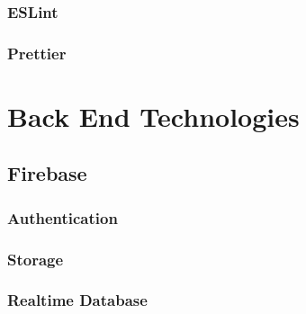 \subsubsection{ESLint}
\subsubsection{Prettier}

\section{Back End Technologies}
\subsection{Firebase}
\subsubsection{Authentication}
\subsubsection{Storage}
\subsubsection{Realtime Database}
